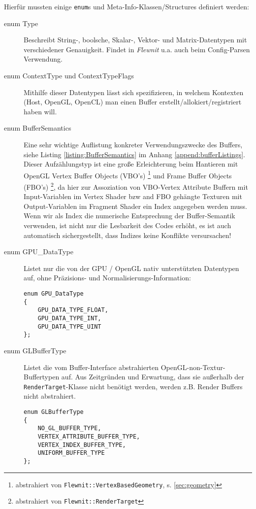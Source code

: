 	Hierfür mussten einige \lstinline|enum|s und Meta-Info-Klassen/Structures definiert werden:
	\begin{description}
		
		\item[enum Type] 
		Beschreibt String-, boolsche, Skalar-, Vektor- und Matrix-Datentypen mit verschiedener 
		Genauigkeit. Findet in \emph{Flewnit} u.a. auch beim Config-Parsen Verwendung.
		
		\item[enum ContextType und ContextTypeFlags] 
		Mithilfe dieser Datentypen lässt sich spezifizieren, in welchem 
		Kontexten (Host, OpenGL, OpenCL) man einen Buffer erstellt/allokiert/registriert haben will.
		
		\item[enum BufferSemantics] 
		Eine sehr wichtige Auflistung konkreter Verwendungszwecke des Buffers,
		siehe Listing \ref{listing:BufferSemantics} im Anhang \ref{append:bufferListings}.
		Dieser Aufzählungstyp ist eine große Erleichterung beim Hantieren mit OpenGL Vertex Buffer Objects (VBO's) 
		\footnote{abstrahiert von \lstinline|Flewnit::VertexBasedGeometry|, s. \ref{sec:geometry} }
		und Frame Buffer Objects (FBO's) 
		\footnote{abstrahiert von \lstinline|Flewnit::RenderTarget|}, 
		da hier zur Assoziation von VBO-Vertex Attribute Buffern mit Input-Variablen im Vertex Shader
		bzw and FBO gehängte Texturen mit Output-Variablen im Fragment Shader
		ein Index angegeben werden muss. 
		Wenn wir als Index die numerische Entsprechung der Buffer-Semantik verwenden, 
		ist nicht nur die Lesbarkeit des Codes erhöht, es ist auch automatisch sichergestellt, 
		dass Indizes keine Konflikte versursachen!
		
		\item[enum GPU\_DataType] Listet nur die von der GPU / OpenGL nativ unterstützten Datentypen auf, ohne
		Präzisions- und Normalisierungs-Information:
		\begin{lstlisting}		
enum GPU_DataType
{
	GPU_DATA_TYPE_FLOAT,
	GPU_DATA_TYPE_INT,
	GPU_DATA_TYPE_UINT
};
		\end{lstlisting}
		
		\item[enum GLBufferType]
		Listet die vom Buffer-Interface abstrahierten OpenGL-non-Textur-Buffertypen auf. 
		Aus Zeitgründen und Erwartung, dass sie außerhalb der \lstinline|RenderTarget|-Klasse nicht benötigt werden,
		werden z.B. Render Buffers nicht abstrahiert.
		\begin{lstlisting}		
enum GLBufferType
{
	NO_GL_BUFFER_TYPE,
	VERTEX_ATTRIBUTE_BUFFER_TYPE,
	VERTEX_INDEX_BUFFER_TYPE,
	UNIFORM_BUFFER_TYPE 
};
		\end{lstlisting}	
	

\end{description}
